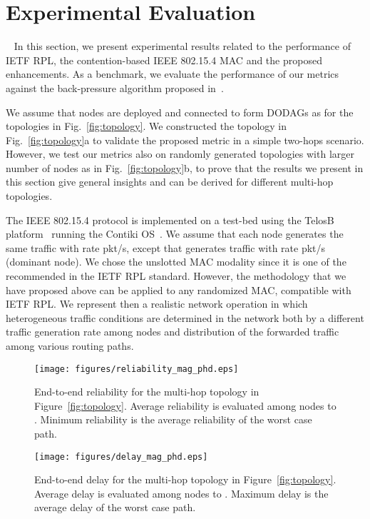 \documentclass[review, 1p, 11pt]{elsarticle}
\numberwithin{equation}{section}
\begin{document}
\section{Experimental Evaluation} ~\label{exp:res}
In this section, we present experimental results related to the
performance of IETF RPL, the contention-based IEEE
802.15.4 MAC and the proposed enhancements.
As a benchmark, we evaluate the performance of our metrics against the back-pressure algorithm proposed in~\cite{BCP}.

We assume that nodes are deployed and connected to form DODAGs as for the topologies in Fig.~\ref{fig:topology}.
We constructed the topology in Fig.~\ref{fig:topology}a to validate the proposed metric in a simple two-hops scenario.
However, we test our metrics also on randomly generated topologies with larger number of nodes as in Fig.~\ref{fig:topology}b, to prove that the results we present in
this section give general insights and can be derived for different multi-hop topologies.

The IEEE 802.15.4 protocol is implemented on a test-bed
using the TelosB platform~\cite{telosb} running the Contiki OS~\cite{contiki}. We assume that each node generates the same
traffic with rate  pkt/s, except  that generates traffic with rate  pkt/s (dominant node). We chose the unslotted MAC modality since it is one of the
recommended in the IETF RPL standard. However, the methodology that we
have proposed above can
be applied to any randomized MAC, compatible with IETF RPL.
We represent then a realistic network operation in which heterogeneous traffic conditions are determined in the network both by a different traffic generation rate among nodes and distribution of the forwarded traffic among various routing paths.

\begin{figure}[t!] \centering
\texttt{[image: figures/reliability\_mag\_phd.eps]}
\caption{End-to-end reliability for the
multi-hop topology in Figure~\ref{fig:topology}. Average reliability is evaluated among nodes  to .
Minimum reliability is the average reliability of the worst case path. \label{fig:mh_rel_mag}}
\end{figure}
\begin{figure}[t] \centering
\texttt{[image: figures/delay\_mag\_phd.eps]}
\caption{End-to-end delay for the multi-hop
topology in Figure~\ref{fig:topology}. Average delay is evaluated among nodes  to .
Maximum delay is the average delay of the worst case path.\label{fig:mh_lat_mag}}
\end{figure}
\end{document}

